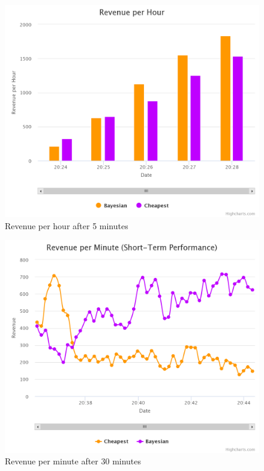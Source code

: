 \documentclass[sigconf]{acmart}
\begin{document}
\begin{figure}[!htb]
  \includegraphics[width=\columnwidth]{pictures/rh_5.png}
  \caption{Revenue per hour after 5 minutes}
  \label{fig:rh_5}
\end{figure}
\begin{figure}[!htb]
  \includegraphics[width=\columnwidth]{pictures/st_25.png}
  \caption{Revenue per minute after 30 minutes}
  \label{fig:st_25}
\end{figure}
\end{document}
